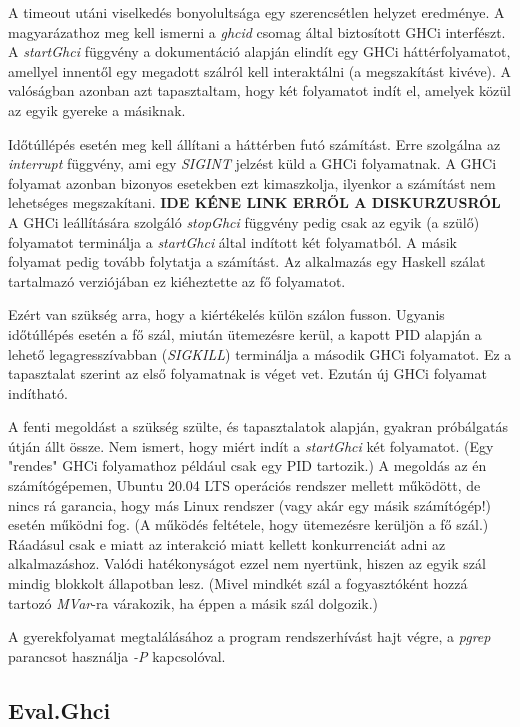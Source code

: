 A timeout utáni viselkedés bonyolultsága egy szerencsétlen helyzet eredménye. A magyarázathoz meg kell ismerni a \textit{ghcid} csomag által biztosított GHCi interfészt. A \textit{startGhci} függvény a dokumentáció alapján elindít egy GHCi háttérfolyamatot, amellyel innentől egy megadott szálról kell interaktálni (a megszakítást kivéve). A valóságban azonban azt tapasztaltam, hogy két folyamatot indít el, amelyek közül az egyik gyereke a másiknak. 

Időtúllépés esetén meg kell állítani a háttérben futó számítást. Erre szolgálna az \textit{interrupt} függvény, ami egy \textit{SIGINT} jelzést küld a GHCi folyamatnak. A GHCi folyamat azonban bizonyos esetekben ezt kimaszkolja, ilyenkor a számítást nem lehetséges megszakítani. \textbf{IDE KÉNE LINK ERRŐL A DISKURZUSRÓL} A GHCi leállítására szolgáló \textit{stopGhci} függvény pedig csak  az egyik (a szülő) folyamatot terminálja a \textit{startGhci} által indított két folyamatból. A másik folyamat pedig tovább folytatja a számítást. Az alkalmazás egy Haskell szálat tartalmazó verziójában ez kiéheztette az fő folyamatot. 

Ezért van szükség arra, hogy a kiértékelés külön szálon fusson. Ugyanis időtúllépés esetén a fő szál, miután ütemezésre kerül, a kapott PID alapján a lehető legagresszívabban (\textit{SIGKILL}) terminálja a második GHCi folyamatot. Ez a tapasztalat szerint az első folyamatnak is véget vet. Ezután új GHCi folyamat indítható.

A fenti megoldást a szükség szülte, és tapasztalatok alapján, gyakran próbálgatás útján állt össze. Nem ismert, hogy miért indít a \textit{startGhci} két folyamatot. (Egy "rendes" GHCi folyamathoz például csak egy PID tartozik.) A megoldás az én számítógépemen, Ubuntu 20.04 LTS operációs rendszer mellett működött, de nincs rá garancia, hogy más Linux rendszer (vagy akár egy másik számítógép!) esetén működni fog. (A működés feltétele, hogy ütemezésre kerüljön a fő szál.) Ráadásul csak e miatt az interakció miatt kellett konkurrenciát adni az alkalmazáshoz. Valódi hatékonyságot ezzel nem nyertünk, hiszen az egyik szál mindig blokkolt állapotban lesz. (Mivel mindkét szál a fogyasztóként hozzá tartozó \textit{MVar}-ra várakozik, ha éppen a másik szál dolgozik.)

A gyerekfolyamat megtalálásához a program rendszerhívást hajt végre, a \textit{pgrep} parancsot használja \textit{-P} kapcsolóval.

\subsection{Eval.Ghci}

